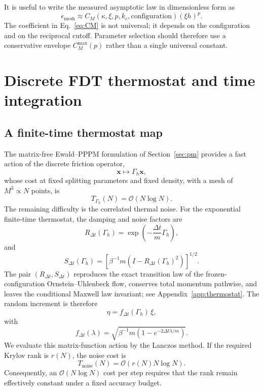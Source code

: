 \documentclass[11pt]{article}
\theoremstyle{plain}
\DeclareRobustCommand{\_}{\textunderscore\allowbreak}
\begin{document}
It is useful to write the measured asymptotic law in dimensionless form as
\begin{equation}
\label{eq:CM}
\epsilon_{\mathrm{mesh}}
\approx
C_M(\kappa,\xi,p,k_c,\text{configuration})
(\xi h)^p.
\end{equation}
The coefficient in Eq.~\eqref{eq:CM} is not universal; it depends on the
configuration and on the reciprocal cutoff. Parameter selection should therefore use a
conservative envelope $C_M^{\max}(p)$ rather than a single universal
constant.

\section{Discrete FDT thermostat and time integration}
\label{sec:thermostat}

\subsection{A finite-time thermostat map}

The matrix-free Ewald--PPPM formulation of Section~\ref{sec:pm} provides a fast action of the discrete friction operator,
\begin{equation}
\bm{x} \mapsto \Gamma_h \bm{x},
\end{equation}
whose cost at fixed splitting parameters and fixed density, with a mesh of
$M^3\propto N$ points, is
\begin{equation}
T_{\Gamma_h}(N)=\mathcal{O}(N\log N).
\end{equation}
The remaining difficulty is the correlated thermal noise. For the exponential finite-time thermostat, the damping and noise factors are
\begin{equation}
R_{\Delta t}(\Gamma_h)=\exp\!\left(-\frac{\Delta t}{m}\Gamma_h\right),
\end{equation}
and
\begin{equation}
S_{\Delta t}(\Gamma_h)
=
\left[
\beta^{-1}m
\left(I-R_{\Delta t}(\Gamma_h)^2\right)
\right]^{1/2}.
\end{equation}
The pair $(R_{\Delta t},S_{\Delta t})$ reproduces the exact transition law of the frozen-configuration Ornstein--Uhlenbeck flow, conserves total momentum pathwise, and leaves the conditional Maxwell law invariant; see Appendix~\ref{app:thermostat}. The random increment is therefore
\begin{equation}
\eta
=
f_{\Delta t}(\Gamma_h)\,\xi,
\end{equation}
with
\begin{equation}
f_{\Delta t}(\lambda)
=
\sqrt{
\beta^{-1}m
\left(1-e^{-2\Delta t\lambda/m}\right)
}.
\end{equation}
We evaluate this matrix-function action by the Lanczos method. If the required Krylov rank is $r(N)$, the noise cost is
\begin{equation}
T_{\mathrm{noise}}(N)
=
\mathcal{O}\!\left(r(N)N\log N\right).
\end{equation}
Consequently, an $\mathcal{O}(N\log N)$ cost per step requires that the rank remain effectively constant under a fixed accuracy budget.
\end{document}
